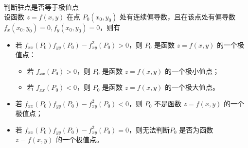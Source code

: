\begin{theorem}[极值的充分条件]判断驻点是否等于极值点\\
    设函数 $z=f(x,y)$ 在点 $P_0(x_0,y_0)$ 处有连续偏导数，且在该点处有偏导数 $f_x(x_0,y_0)=0,f_y(x_0,y_0)=0$，则有
    \begin{itemize}
        \item 若 $f_{xx}(P_0)f_{yy}(P_0)-f_{xy}^2(P_0)>0$，则 $P_0$ 是函数 $z=f(x,y)$ 的一个极值点：
              \begin{itemize}
                  \item 若 $f_{xx}(P_0)>0$，则 $P_0$ 是函数 $z=f(x,y)$ 的一个极小值点；
                  \item 若 $f_{xx}(P_0)<0$，则 $P_0$ 是函数 $z=f(x,y)$ 的一个极大值点。
              \end{itemize}
        \item 若 $f_{xx}(P_0)f_{yy}(P_0)-f_{xy}^2(P_0)<0$，则 $P_0$ 不是函数 $z=f(x,y)$ 的一个极值点；
        \item 若 $f_{xx}(P_0)f_{yy}(P_0)-f_{xy}^2(P_0)=0$，则无法判断$P_0$ 是否为函数 $z=f(x,y)$ 的一个极值点。
    \end{itemize}
\end{theorem}